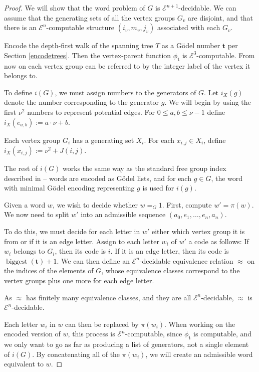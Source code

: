 \documentclass[a4paper]{article}
\newcommand{\grz}[1]{$\mathcal{E}^{#1}$}	%
\newcommand{\tvec}{\mathbf{t}}	%
\theoremstyle{plain}
\theoremstyle{definition}
\begin{document}
\begin{proof}
	We will show that the word problem of $G$ is \grz{n+1}-decidable. We can assume that the generating sets of all the vertex groups $G_v$ are disjoint, and that there is an \grz{n}-computable structure $(i_v,m_v,j_v)$ associated with 
each $G_v$.

Encode the depth-first walk of the spanning tree $T$ as a G\"odel number $\tvec$ per Section \ref{encodetrees}. Then the vertex-parent function $\phi_{\tvec}$ is \grz{3}-computable. From now on each vertex group can be referred to by the integer label of the vertex it belongs to.

To define $i(G)$, we must assign numbers to the generators of $G$. Let $i_X(g)$ denote the number corresponding to the generator $g$. We will begin by using the first $\nu^2$ numbers to represent potential edges. For $0 \leq a,b \leq \nu - 1$ define $i_X(e_{a,b}) := a \cdot \nu + b$.

Each vertex group $G_i$ has a generating set $X_i$. For each $x_{i,j} \in X_i$, define $i_X(x_{i,j}) := \nu^2 + J(i,j)$.

The rest of $i(G)$ works the same way as the standard free group index described in \cite[Lemma 3.1]{Cannonito_1973} -- words are encoded as G\"odel lists, and for each $g \in G$, the word with minimal G\"odel encoding representing $g$ is used for $i(g)$.	

Given a word $w$, we wish to decide whether $w =_G 1$. First, compute $w' = \pi(w)$. We now need to split $w'$ into an admissible sequence $(a_0,e_1,\dots,e_n,a_n)$.

To do this, we must decide for each letter in $w'$ either which vertex group it is from or if it is an edge letter. Assign to each letter $w_i$ of $w'$ a code as follows: If $w_i$ belongs to $G_i$, then its code is $i$. If it is an edge letter, then its code is $\operatorname{biggest}(\tvec)+1$. We can then define an \grz{n}-decidable equivalence relation $\approx$ on the indices of the elements of $G$, whose equivalence classes correspond to the vertex groups plus one more for each edge letter.

As $\approx$ has finitely many equivalence classes, and they are all \grz{n}-decidable, $\approx$ is \grz{n}-decidable.

Each letter $w_i$ in $w$ can then be replaced by $\pi(w_i)$. When working on the encoded version of $w$, this process is \grz{n}-computable, since $\phi_{\tvec}$ is computable, and we only want to go as far as producing a list of generators, not a single element of $i(G)$. By concatenating all of the $\pi(w_i)$, we will create an admissible word equivalent to $w$.


\end{proof}
\end{document}
